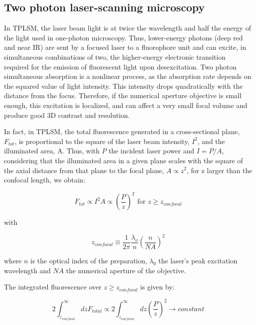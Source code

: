 \subsection{Two photon laser-scanning microscopy }

In TPLSM, the laser beam light is at twice the wavelength and half the energy of the light used in one-photon microscopy. Thus, lower-energy photons (deep red and near IR) are sent by a focused laser to a fluorophore unit and can excite, in simultaneous combinations of two, the higher-energy electronic transition required for the emission of fluorescent light upon desexcitation. Two photon simultaneous absorption is a nonlinear process, as the absorption rate depends on the squared value of light intensity. This intensity drops quadratically with the distance from the focus. Therefore, if the numerical aperture objective is small enough, this excitation is localized, and can affect a very small focal volume and produce good 3D contrast and resolution.

In fact, in TPLSM, the total fluorescence generated in a cross-sectional plane, $F_{tot}$, is proportional to the square of the laser beam intensity, $I^2$, and the illuminated area, A. Thus, with $P$ the incident laser power and $I=P/A$, considering that the illuminated area in a given plane scales with the square of the axial distance from that plane to the focal plane, $A \propto z^2$, for z larger than the confocal length, we obtain:

\begin{equation}
F_ {tot} \propto I^2 A \propto \left( \dfrac{P}{z}\right)^2 \text{ for } z \geqslant z_{confocal}
\end{equation}

with

\begin{equation}
z_{confocal}\equiv \dfrac{1}{2 \pi} \dfrac{\lambda _o}{n} \left( \dfrac{n}{NA} \right)^2
\end{equation}

where $n$ is the optical index of the preparation, $\lambda _0$ the laser's peak excitation wavelength and $NA$ the numerical aperture of the objective.

The integrated fluorescence over $z \geqslant z_{confocal}$ is given by:

\begin{equation}
2 \int_{z_{confocal}}^{\infty} dz F_{total} \propto  2 \int_{z_{confocal}}^{\infty} dz \left( \dfrac{P}{z}\right)^2 \to constant
\end{equation}

